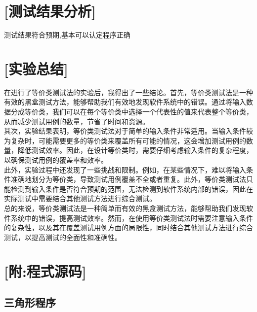 \documentclass{article}
\newcommand{\bash}{/home/kevin/Documents/rust/tesxsthw1/src/test2.sh}
\begin{document}
{\section{[测试结果分析]}

测试结果符合预期,基本可以认定程序正确\\

\section{[实验总结]}

在进行了等价类测试法的实验后，我得出了一些结论。首先，等价类测试法是一种有效的黑盒测试方法，能够帮助我们有效地发现软件系统中的错误。通过将输入数据分成等价类，我们可以在每个等价类中选择一个代表性的值来代表整个等价类，从而减少测试用例的数量，节省了时间和资源。\\

其次，实验结果表明，等价类测试法对于简单的输入条件非常适用。当输入条件较为复杂时，可能需要更多的等价类来覆盖所有可能的情况，这会增加测试用例的数量，降低测试效率。因此，在设计等价类时，需要仔细考虑输入条件的复杂程度，以确保测试用例的覆盖率和效率。\\

此外，实验过程中还发现了一些挑战和限制。例如，在某些情况下，难以将输入条件准确地划分为等价类，导致测试用例覆盖不全或者重复。此外，等价类测试法只能检测到输入条件是否符合预期的范围，无法检测到软件系统内部的错误，因此在实际测试中需要结合其他测试方法进行综合测试。\\

总的来说，等价类测试法是一种简单而有效的黑盒测试方法，能够帮助我们发现软件系统中的错误，提高测试效率。然而，在使用等价类测试法时需要注意输入条件的复杂性，以及其在覆盖测试用例方面的局限性，同时结合其他测试方法进行综合测试，以提高测试的全面性和准确性。\\
\section{[附:程式源码]}

\subsection{三角形程序}




\renewcommand{\bash}{/home/kevin/Documents/rust/tesxsthw1/src/test2_1.sh}



}
\end{document}
